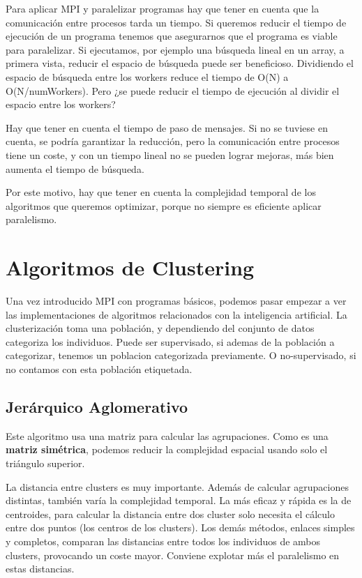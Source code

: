 	\vspace*{0.2cm}
	
	Para aplicar MPI y paralelizar programas hay que tener en cuenta que la comunicación entre procesos tarda un tiempo. Si queremos reducir el tiempo de ejecución de un programa tenemos que asegurarnos que el programa es viable para paralelizar. Si ejecutamos, por ejemplo una búsqueda lineal en un array, a primera vista, reducir el espacio de búsqueda puede ser beneficioso. Dividiendo el espacio de búsqueda entre los workers reduce el tiempo de O(N) a O(N/numWorkers). Pero ¿se puede reducir el tiempo de ejecución al dividir el espacio entre los workers? 
	
	Hay que tener en cuenta el tiempo de paso de mensajes. Si no se tuviese en cuenta, se podría garantizar la reducción, pero la comunicación entre procesos tiene un coste, y con un tiempo lineal no se pueden lograr mejoras, más bien aumenta el tiempo de búsqueda.
	
	Por este motivo, hay que tener en cuenta la complejidad temporal de los algoritmos que queremos optimizar, porque no siempre es eficiente aplicar paralelismo.

	\newpage 

\section{Algoritmos de Clustering}

	Una vez introducido MPI con programas básicos, podemos pasar empezar a ver las implementaciones de algoritmos relacionados con la inteligencia artificial. La clusterización toma una población, y dependiendo del conjunto de datos categoriza los individuos. Puede ser supervisado, si ademas de la población a categorizar, tenemos un poblacion categorizada previamente. O no-supervisado, si no contamos con esta población etiquetada.

	\subsection{Jerárquico Aglomerativo}
		Este algoritmo usa una matriz para calcular las agrupaciones. Como es una \textbf{matriz simétrica}, podemos reducir la complejidad espacial usando solo el triángulo superior. 
		
		La distancia entre clusters es muy importante. Además de calcular agrupaciones distintas, también varía la complejidad temporal. La más eficaz y rápida es la de centroides, para calcular la distancia entre dos cluster solo necesita el cálculo entre dos puntos (los centros de los clusters). Los demás métodos, enlaces simples y completos, comparan las distancias entre todos los individuos de ambos clusters, provocando un coste mayor. Conviene explotar más el paralelismo en estas distancias.
		
